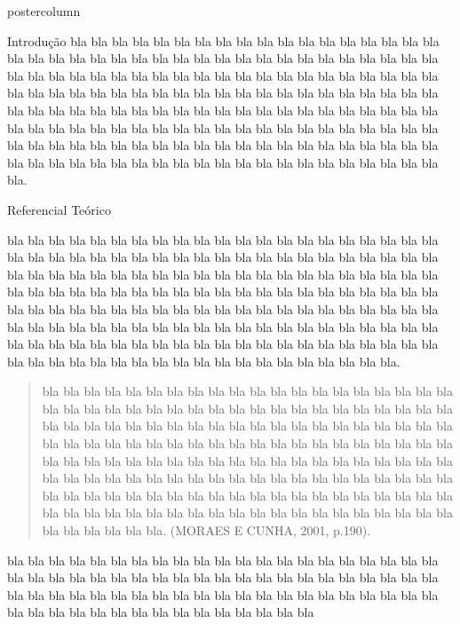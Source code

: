 \documentclass{beamer}
\begin{document}
\begin{frame}
\begin{columns}
\begin{column}{.49 \textwidth}
\begin{beamercolorbox}[center, wd= \textwidth]{postercolumn}
\begin{minipage}[T]{.95 \textwidth}
{\begin{block}{{\Large Introdução}}
\justifying
{\large
bla bla bla bla bla bla bla bla bla bla bla bla bla bla bla bla bla bla bla bla bla bla bla bla bla bla bla bla bla bla bla bla bla bla bla bla bla bla bla bla bla bla bla bla bla bla bla bla bla bla bla bla bla bla bla bla bla bla bla bla bla bla bla bla bla bla bla bla bla bla bla bla bla bla bla bla bla bla 
bla bla bla bla bla bla bla bla bla bla bla bla bla bla bla bla bla bla bla bla bla bla bla bla bla bla bla bla bla bla bla bla bla bla bla bla bla bla bla bla bla bla bla bla bla bla bla bla bla bla bla bla bla bla bla bla bla bla bla bla bla bla bla bla bla bla bla bla bla bla bla bla bla bla bla bla bla bla 
bla bla bla bla bla bla bla bla bla bla.}
\end{block}
\vspace{2cm}
\begin{block}{{\Large Referencial Teórico}}
\justifying
{\large
bla bla bla bla bla bla bla bla bla bla bla bla bla bla bla bla bla bla bla bla bla bla bla bla bla bla bla bla bla bla bla bla bla bla bla bla bla bla bla bla bla bla bla bla bla bla bla bla bla bla bla bla bla bla bla bla bla bla bla bla bla bla bla bla bla bla bla bla bla bla bla bla bla bla bla bla bla bla 
bla bla bla bla bla bla bla bla bla bla bla bla bla bla bla bla bla bla bla bla bla bla bla bla bla bla bla bla bla bla bla bla bla bla bla bla bla bla bla bla bla bla bla bla bla bla bla bla bla bla bla bla bla bla bla bla bla bla bla bla bla bla bla bla bla bla bla bla bla bla bla bla bla bla bla bla bla bla 
bla bla bla bla bla bla bla bla bla bla.
\vspace{2cm}
\begin{quote}
bla bla bla bla bla bla bla bla bla bla bla bla bla bla bla bla bla bla bla bla bla bla bla bla bla bla bla bla bla bla bla bla bla bla bla bla bla bla bla bla bla bla bla bla bla bla bla bla bla bla bla bla bla bla bla bla bla bla bla bla bla bla bla bla bla bla bla bla bla bla bla bla bla bla bla bla bla bla 
bla bla bla bla bla bla bla bla bla bla bla bla bla bla bla bla bla bla bla bla bla bla bla bla bla bla bla bla bla bla bla bla bla bla bla bla bla bla bla bla bla bla bla bla bla bla bla bla bla bla bla bla bla bla bla bla bla bla bla bla bla bla bla bla bla bla bla bla bla bla bla bla bla bla bla bla bla bla 
bla bla bla bla bla bla bla bla bla bla. (MORAES E CUNHA, 2001, p.190).
\end{quote}
\vspace{2cm}
bla bla bla bla bla bla bla bla bla bla bla bla bla bla bla bla bla bla bla bla bla bla bla bla bla bla bla bla bla bla bla bla bla bla bla bla bla bla bla bla bla bla bla bla bla bla bla bla bla bla bla bla bla bla bla bla bla bla bla bla bla bla bla bla bla bla bla bla bla bla bla bla bla bla bla bla bla bla 
}
\end{block}}
\end{minipage}
\end{beamercolorbox}
\end{column}
\end{columns}
\end{frame}
\end{document}
